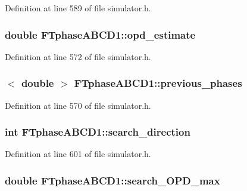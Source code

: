 Definition at line 589 of file simulator.h.

\hypertarget{classFTphaseABCD1_a1bd4c1bbc7cb8da4effbd2c504d59095}{
\subsubsection[{opd\_\-estimate}]{\setlength{\rightskip}{0pt plus 5cm}double {\bf FTphaseABCD1::opd\_\-estimate}}}
\label{classFTphaseABCD1_a1bd4c1bbc7cb8da4effbd2c504d59095}


Definition at line 572 of file simulator.h.

\hypertarget{classFTphaseABCD1_a487b4132e28a60a96fe2efb261949d3b}{
\subsubsection[{previous\_\-phases}]{$<$ double $>$ {\bf FTphaseABCD1::previous\_\-phases}}}
\label{classFTphaseABCD1_a487b4132e28a60a96fe2efb261949d3b}


Definition at line 570 of file simulator.h.

\hypertarget{classFTphaseABCD1_af9b64e90d9caa370af927c215a3338b3}{
\subsubsection[{search\_\-direction}]{\setlength{\rightskip}{0pt plus 5cm}int {\bf FTphaseABCD1::search\_\-direction}}}
\label{classFTphaseABCD1_af9b64e90d9caa370af927c215a3338b3}


Definition at line 601 of file simulator.h.

\hypertarget{classFTphaseABCD1_a57b2a0912986a072b9b4b7c994b9a6a9}{
\subsubsection[{search\_\-OPD\_\-max}]{\setlength{\rightskip}{0pt plus 5cm}double {\bf FTphaseABCD1::search\_\-OPD\_\-max}}}
\label{classFTphaseABCD1_a57b2a0912986a072b9b4b7c994b9a6a9}


